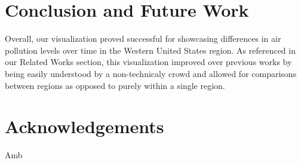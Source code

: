 \documentclass[journal]{vgtc}                %
\begin{document}
\section{Conclusion and Future Work}

Overall, our visualization proved successful for showcasing differences
in air pollution levels over time in the Western United States region.
As referenced in our Related Works section, this visualization improved
over previous works by being easily understood by a non-technicaly crowd
and allowed for comparisons between regions as opposed to purely within
a single region.


\section{Acknowledgements}

Amb
\end{document}
